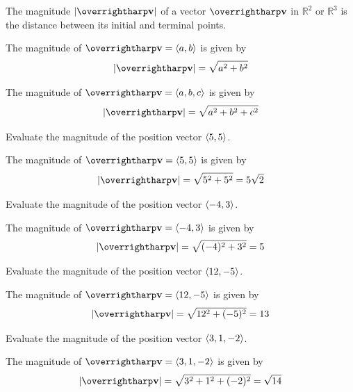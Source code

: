 \documentclass[letterpaper, twoside, 12pt]{book}
\begin{document}
\begin{definition}
  The magnitude $|\harpvec{v}|$ of a vector $\harpvec{v}$ in $\mathbb{R}^2$ or
  $\mathbb{R}^3$ is the distance between its initial and terminal points.
\end{definition}

\begin{theorem}
  The magnitude of $\harpvec{v}=\<a,b\>$ is given by
    \[|\harpvec{v}|=\sqrt{a^2+b^2}\]

  The magnitude of $\harpvec{v}=\<a,b,c\>$ is given by
    \[|\harpvec{v}|=\sqrt{a^2+b^2+c^2}\]
\end{theorem}



          \begin{problem}
            Evaluate the magnitude of the position vector $\langle5,5\rangle$.
          \end{problem}

          \begin{solution}
  The magnitude of $\vect{v}=\<5,5\>$ is given by
  \[|\vect{v}|=\sqrt{5^2+5^2}=5\sqrt{2}\]
          \end{solution}

          \begin{problem}
            Evaluate the magnitude of the position vector $\langle-4,3\rangle$.
          \end{problem}

          \begin{solution}
  The magnitude of $\vect{v}=\<-4,3\>$ is given by
  \[|\vect{v}|=\sqrt{(-4)^2+3^2}=5\]
          \end{solution}

          \begin{problem}
            Evaluate the magnitude of the position vector $\langle12,-5\rangle$.
          \end{problem}

          \begin{solution}
  The magnitude of $\vect{v}=\<12,-5\>$ is given by
  \[|\vect{v}|=\sqrt{12^2+(-5)^2}=13\]
          \end{solution}

          \begin{problem}
            Evaluate the magnitude of the position vector $\langle3,1,-2\rangle$.
          \end{problem}

          \begin{solution}
  The magnitude of $\vect{v}=\<3,1,-2\>$ is given by
  \[|\vect{v}|=\sqrt{3^2+1^2+(-2)^2}=\sqrt{14}\]
          \end{solution}
\end{document}
